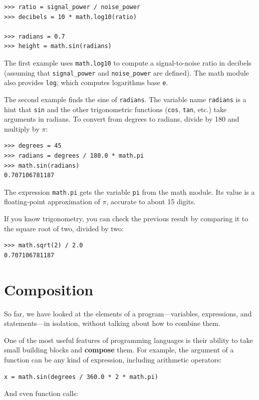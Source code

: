 \documentclass[10pt]{book}
\begin{document}
\begin{verbatim}
>>> ratio = signal_power / noise_power
>>> decibels = 10 * math.log10(ratio)

>>> radians = 0.7
>>> height = math.sin(radians)
\end{verbatim}
%
The first example uses \verb"math.log10" to compute
a signal-to-noise ratio in decibels (assuming that \verb"signal_power" and
\verb"noise_power" are defined).  The math module also provides {\tt log},
which computes logarithms base {\tt e}.

The second example finds the sine of {\tt radians}.  The variable name {\tt radians} is a hint that {\tt sin} and the other trigonometric
functions ({\tt cos}, {\tt tan}, etc.)  take arguments in radians. To
convert from degrees to radians, divide by 180 and multiply by
$\pi$:

\begin{verbatim}
>>> degrees = 45
>>> radians = degrees / 180.0 * math.pi
>>> math.sin(radians)
0.707106781187
\end{verbatim}
%
The expression {\tt math.pi} gets the variable {\tt pi} from the math
module.  Its value is a floating-point approximation
of $\pi$, accurate to about 15 digits.

If you know
trigonometry, you can check the previous result by comparing it to
the square root of two, divided by two:

\begin{verbatim}
>>> math.sqrt(2) / 2.0
0.707106781187
\end{verbatim}
%

\section{Composition}

So far, we have looked at the elements of a program---variables,
expressions, and statements---in isolation, without talking about how to
combine them.

One of the most useful features of programming languages is their
ability to take small building blocks and {\bf compose} them.  For
example, the argument of a function can be any kind of expression,
including arithmetic operators:

\begin{verbatim}
x = math.sin(degrees / 360.0 * 2 * math.pi)
\end{verbatim}
%
And even function calls:
\end{document}
